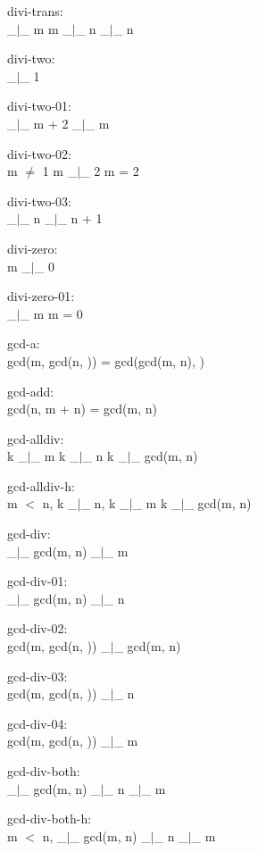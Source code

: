 \documentclass[a4paper]{article}
\begin{document}
divi-trans:\\ \Fol {} \_$|$\_ m \And m \_$|$\_ n \Imp {} \_$|$\_ n

divi-two:\\ \Fol {} \_$|$\_ 1

divi-two-01:\\  \_$|$\_ m + 2  \_$|$\_ m

divi-two-02:\\ \Fol m $\neq$ 1 \Imp m \_$|$\_ 2 \Equiv m = 2

divi-two-03:\\ \Fol {} \_$|$\_ n  \_$|$\_ n + 1

divi-zero:\\ \Fol m \_$|$\_ 0

divi-zero-01:\\  \_$|$\_ m \Equiv m = 0

gcd-a:\\ \Fol gcd(m, gcd(n, )) = gcd(gcd(m, n), )

gcd-add:\\ \Fol gcd(n, m + n) = gcd(m, n)

gcd-alldiv:\\ \Fol k \_$|$\_ m \And k \_$|$\_ n \Imp k \_$|$\_ gcd(m, n)

gcd-alldiv-h:\\m $<$ n, k \_$|$\_ n, k \_$|$\_ m \Fol k \_$|$\_ gcd(m, n)

gcd-div:\\ \Fol {} \_$|$\_ gcd(m, n) \Imp {} \_$|$\_ m

gcd-div-01:\\ \Fol {} \_$|$\_ gcd(m, n) \Imp {} \_$|$\_ n

gcd-div-02:\\ \Fol gcd(m, gcd(n, )) \_$|$\_ gcd(m, n)

gcd-div-03:\\ \Fol gcd(m, gcd(n, )) \_$|$\_ n

gcd-div-04:\\ \Fol gcd(m, gcd(n, )) \_$|$\_ m

gcd-div-both:\\ \Fol {} \_$|$\_ gcd(m, n) \Imp {} \_$|$\_ n \And {} \_$|$\_ m

gcd-div-both-h:\\m $<$ n,  \_$|$\_ gcd(m, n) \Fol {} \_$|$\_ n \And {} \_$|$\_ m
\end{document}
